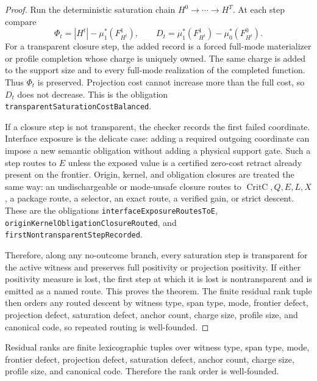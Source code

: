 \documentclass[10.5pt,a4paper]{article}
\newcommand{\CritC}{\operatorname{CritC}}
\begin{document}
\begin{proof}
Run the deterministic saturation chain \(H^0\to\cdots\to H^T\).  At each step compare
\[
\Phi_t=|H^t|-\mu_1^*(F_{H^t}^1),\qquad
D_t=\mu_1^*(F_{H^t}^1)-\mu_0^*(F_{H^t}^0).
\]
For a transparent closure step, the added record is a forced full-mode materializer or profile completion whose charge is uniquely owned.  The same charge is added to the support size and to every full-mode realization of the completed function.  Thus \(\Phi_t\) is preserved.  Projection cost cannot increase more than the full cost, so \(D_t\) does not decrease.  This is the obligation \texttt{transparentSaturationCostBalanced}.

If a closure step is not transparent, the checker records the first failed coordinate.  Interface exposure is the delicate case: adding a required outgoing coordinate can impose a new semantic obligation without adding a physical support gate.  Such a step routes to \(E\) unless the exposed value is a certified zero-cost retract already present on the frontier.  Origin, kernel, and obligation closures are treated the same way: an undischargeable or mode-unsafe closure routes to \(\CritC,Q,E,L,X\), a package route, a selector, an exact route, a verified gain, or strict descent.  These are the obligations \texttt{interfaceExposureRoutesToE}, \texttt{originKernelObligationClosureRouted}, and \texttt{firstNontransparentStepRecorded}.

Therefore, along any no-outcome branch, every saturation step is transparent for the active witness and preserves full positivity or projection positivity.  If either positivity measure is lost, the first step at which it is lost is nontransparent and is emitted as a named route.  This proves the theorem.  The finite residual rank tuple then orders any routed descent by witness type, span type, mode, frontier defect, projection defect, saturation defect, anchor count, charge size, profile size, and canonical code, so repeated routing is well-founded.
\end{proof}

Residual ranks are finite lexicographic tuples over witness type, span type, mode, frontier defect, projection defect, saturation defect, anchor count, charge size, profile size, and canonical code. Therefore the rank order is well-founded.
\end{document}
